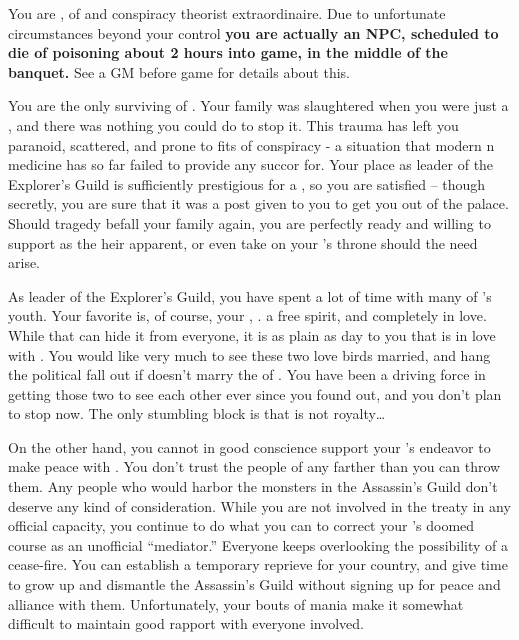 \documentclass[char]{NeptuneBall}
\begin{document}
\name{\cPlant{}}

You are \cPlant{}, \cPlant{\prince} of \pAtlantis{} and conspiracy theorist extraordinaire. Due to unfortunate circumstances beyond your control {\bf you are actually an NPC, scheduled to die of poisoning about 2 hours into game, in the middle of the banquet. }  See a GM before game for details about this.

You are the only surviving \cPlant{\sibling} of \cKing{}. Your family was slaughtered when you were just a \cPlant{\kid}, and there was nothing you could do to stop it. This trauma has left you paranoid, scattered, and prone to fits of conspiracy - a situation that modern \pAtlantis{}n medicine has so far failed to provide any succor for. Your place as leader of the Explorer's Guild is sufficiently prestigious for a \cPlant{\prince}, so you are satisfied -- though secretly, you are sure that it was a post given to you to get you out of the palace. Should tragedy befall your family again, you are perfectly ready and willing to support \cPrincess{\prince} \cPrincess{} as the heir apparent, or even take on your \cKing{\sibling}'s throne should the need arise.

As leader of the Explorer's Guild, you have spent a lot of time with many of \pAtlantis{}'s youth. Your favorite is, of course, your \cPrincess{\nephew}, \cPrincess{\prince} \cPrincess{}. \cPrincess{\They} \cPrincess{\are} a free spirit, and completely in love. While \cPrincess{\they}  that \cPrincess{\they} can hide it from everyone, it is as plain as day to you that \cPrincess{} is in love with \cDiplomat{}. You would like very much to see these two love birds married, and hang the political fall out if \cPrincess{} doesn't marry the \cPrince{\prince} of \pPacifica{}. You have been a driving force in getting those two to see each other ever since you found out, and you don't plan to stop now. The only stumbling block is that \cDiplomat{} is not royalty\ldots

On the other hand, you cannot in good conscience support your \cKing{\sibling}'s endeavor to make peace with \pPacifica{}. You don't trust the people of \pPacifica{} any farther than you can throw them. Any people who would harbor the monsters in the Assassin's Guild don't deserve any kind of consideration. While you are not involved in the treaty in any official capacity, you continue to do what you can to correct your \cKing{\sibling}'s doomed course as an unofficial ``mediator.'' Everyone keeps overlooking the possibility of a cease-fire. You can establish a temporary reprieve for your country, and give \pPacifica{} time to grow up and dismantle the Assassin's Guild without signing up for peace and alliance with them. Unfortunately, your bouts of mania make it somewhat difficult to maintain good rapport with everyone involved.
\end{document}
